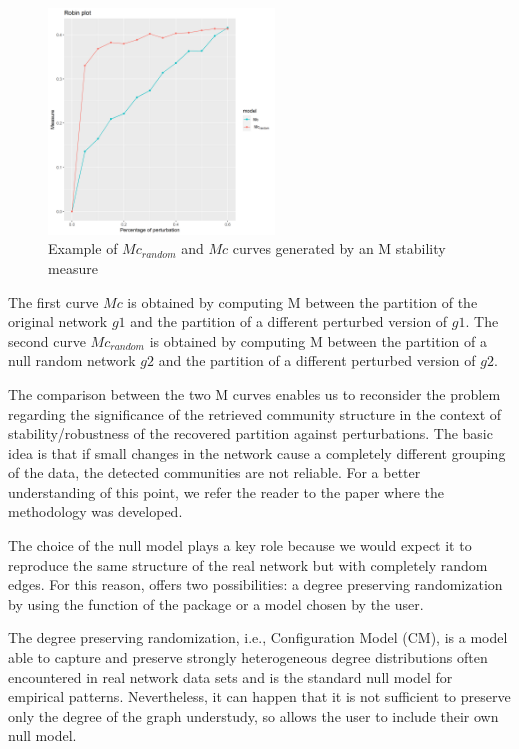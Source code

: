 \begin{figure}[!h]
\centering
\includegraphics[width=.5\textwidth, height=6cm]{PlotExample.png}
\caption{\label{fig:PlotExample} Example of $Mc_{random}$ and $Mc$ curves generated by an M stability measure}
\end{figure}


The first curve $Mc$ is obtained by computing M between the partition of the original network $g1$ and the partition of a different perturbed version of $g1$. The second curve $Mc_{random}$ is obtained by computing
M between the partition of a null random network  $g2$ and the partition of a different perturbed version of  $g2$. 



The comparison between the two M curves enables us to reconsider the problem regarding the significance of the retrieved community structure in the context of stability/robustness of the recovered partition against perturbations. 
The basic idea is that if small changes in the network cause a completely different grouping of the data, the detected communities are not reliable. 
For a better understanding of this point, we refer the reader to the paper \cite{Carissimo_et_al:2018} where the methodology was developed. 


The choice of the null model plays a key role because we would expect it to reproduce the same structure of the real network but with completely random edges.
For this reason,  offers two possibilities: a degree preserving randomization by using the  function of the   package or a model chosen by the user. 



The degree preserving randomization, i.e., Configuration Model (CM), is a model able to capture and preserve strongly heterogeneous degree distributions often encountered in real network data sets and is the standard null model for empirical patterns. Nevertheless, it can happen that it is not sufficient to preserve only the degree of the graph understudy, so  allows the user to include their own null model. 



